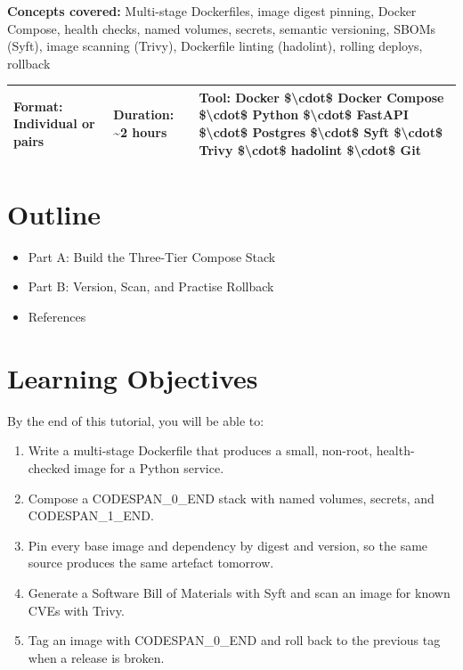 \documentclass[11pt,a4paper]{book}
\begin{document}
\textbf{Concepts covered:} Multi-stage Dockerfiles, image digest pinning, Docker Compose, health checks, named volumes, secrets, semantic versioning, SBOMs (Syft), image scanning (Trivy), Dockerfile linting (hadolint), rolling deploys, rollback

\begin{tabular}{lll}
\hline
\textbf{Format:} Individual or pairs & \textbf{Duration:} \textasciitilde{}2 hours & \textbf{Tool:} Docker \$\textbackslash{}cdot\$ Docker Compose \$\textbackslash{}cdot\$ Python \$\textbackslash{}cdot\$ FastAPI \$\textbackslash{}cdot\$ Postgres \$\textbackslash{}cdot\$ Syft \$\textbackslash{}cdot\$ Trivy \$\textbackslash{}cdot\$ hadolint \$\textbackslash{}cdot\$ Git \\
\hline
\end{tabular}

\medskip

\section{Outline}

\begin{itemize}
  \item Part A: Build the Three-Tier Compose Stack
  \item Part B: Version, Scan, and Practise Rollback
  \item References
\end{itemize}

\medskip

\section{Learning Objectives}

By the end of this tutorial, you will be able to:

\begin{enumerate}
  \item Write a multi-stage Dockerfile that produces a small, non-root, health-checked image for a Python service.
  \item Compose a CODESPAN\_0\_END stack with named volumes, secrets, and CODESPAN\_1\_END.
  \item Pin every base image and dependency by digest and version, so the same source produces the same artefact tomorrow.
  \item Generate a Software Bill of Materials with Syft and scan an image for known CVEs with Trivy.
  \item Tag an image with CODESPAN\_0\_END and roll back to the previous tag when a release is broken.
\end{enumerate}
\end{document}
